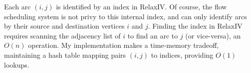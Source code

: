 Each arc $(i,j)$ is identified by an index in RelaxIV. Of course, the flow scheduling system is not privy to this internal index, and can only identify arcs by their source and destination vertices $i$ and $j$. Finding the index in RelaxIV requires scanning the adjacency list of $i$ to find an arc to $j$ (or vice-versa), an $O(n)$ operation. My implementation makes a time-memory tradeoff, maintaining a hash table mapping pairs $(i,j)$ to indices, providing $O(1)$ lookups\footnotemark.

%
%
%
%
%
%
%
%
%
%
%

